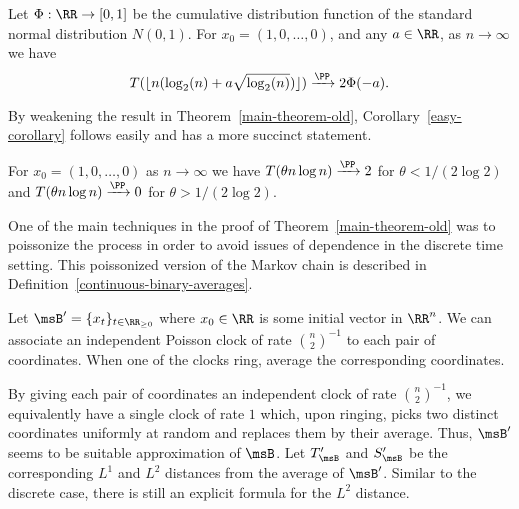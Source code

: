 \documentclass[12pt]{article}
\begin{document}
\begin{thm} \label{main-theorem-old}
	Let $\Phi : \RR \to [0, 1]$ be the cumulative distribution function of the standard normal distribution $N(0, 1)$. For $x_0 = (1, 0, \ldots, 0)$, and any $a \in \RR$, as $n \to \infty$ we have 
	\[
		T(\lfloor n(\log_2(n) + a \sqrt{\log_2(n)}) \rfloor) \xrightarrow{\PP} 2 \Phi(-a).
	\]
\end{thm}

By weakening the result in Theorem~\ref{main-theorem-old}, Corollary~\ref{easy-corollary} follows easily and has a more succinct statement. 

\begin{cor} \label{easy-corollary}
	For $x_0 = (1, 0, \ldots, 0)$ as $n \to \infty$ we have $T(\theta n \log n) \xrightarrow{\PP} 2$ for $\theta < 1/(2 \log 2)$ and $T(\theta n \log n) \xrightarrow{\PP} 0$ for $\theta > 1/(2 \log 2)$. 
\end{cor}

One of the main techniques in the proof of Theorem~\ref{main-theorem-old} was to poissonize the process in order to avoid issues of dependence in the discrete time setting. This poissonized version of the Markov chain is described in Definition~\ref{continuous-binary-averages}. 

\begin{defn} \label{continuous-binary-averages}
	Let $\msB' = \{x_t\}_{t \in \RR_{\geq 0}}$ where $x_0 \in \RR$ is some initial vector in $\RR^n$. We can associate an independent Poisson clock of rate $\binom{n}{2}^{-1}$ to each pair of coordinates. When one of the clocks ring, average the corresponding coordinates.  
\end{defn}

By giving each pair of coordinates an independent clock of rate $\binom{n}{2}^{-1}$, we equivalently have a single clock of rate $1$ which, upon ringing, picks two distinct coordinates uniformly at random and replaces them by their average. Thus, $\msB'$ seems to be suitable approximation of $\msB$. Let $T'_\msB$ and $S'_\msB$ be the corresponding $L^1$ and $L^2$ distances from the average of $\msB'$. Similar to the discrete case, there is still an explicit formula for the $L^2$ distance.
\end{document}
